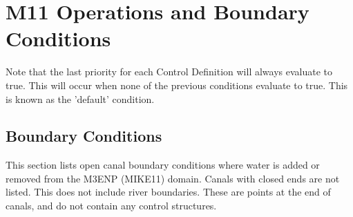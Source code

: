




\graphicspath{{../figs/}{../../../../../../ENP_FILES/LATEX/figs-not-in-git}} %


\pagestyle{sfnrctech1}


\setcounter{page}{1}  %

\begingroup
\sffamily
\tableofcontents
\endgroup
\cleardoublepage


\normalsize

\section{M11 Operations and Boundary Conditions}

\normalsize
Note that the last priority for each Control Definition will always evaluate to true. This will occur when none of the previous conditions evaluate to true. This is known as the 'default' condition.


\clearpage
\subsection{Boundary Conditions}

This section lists open canal boundary conditions where water is added or removed from the M3ENP (MIKE11) domain. Canals with closed ends are not listed. This does not include river boundaries. These are points at the end of canals, and do not contain any control structures.

